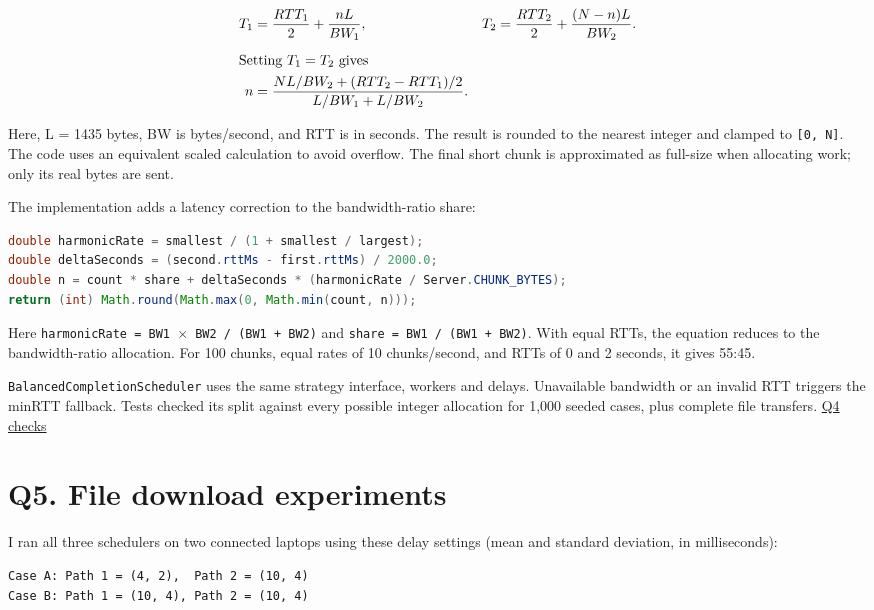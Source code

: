 \documentclass[11pt,a4paper]{article}
\begin{document}
\begin{align*}
T_1 &= \frac{RTT_1}{2}+\frac{nL}{BW_1}, &
T_2 &= \frac{RTT_2}{2}+\frac{(N-n)L}{BW_2}.\\[5pt]
\intertext{Setting $T_1=T_2$ gives}
n &= \frac{NL/BW_2+(RTT_2-RTT_1)/2}{L/BW_1+L/BW_2}.
\end{align*}

Here, L = 1435 bytes, BW is bytes/second, and RTT is in seconds. The result is rounded
to the nearest integer and clamped to \texttt{[0, N]}. The code uses an equivalent scaled
calculation to avoid overflow. The final short chunk is approximated as full-size
when allocating work; only its real bytes are sent.


The implementation adds a latency correction to the bandwidth-ratio share:


\begin{lstlisting}[language=Java]
double harmonicRate = smallest / (1 + smallest / largest);
double deltaSeconds = (second.rttMs - first.rttMs) / 2000.0;
double n = count * share + deltaSeconds * (harmonicRate / Server.CHUNK_BYTES);
return (int) Math.round(Math.max(0, Math.min(count, n)));
\end{lstlisting}

Here \texttt{harmonicRate = BW1 \(\times\) BW2 / (BW1 + BW2)} and \texttt{share = BW1 / (BW1 + BW2)}.
With equal RTTs, the equation reduces to the bandwidth-ratio allocation. For 100
chunks, equal rates of 10 chunks/second, and RTTs of 0 and 2 seconds, it gives 55:45.


\texttt{BalancedCompletionScheduler} uses the same strategy interface, workers and delays.
Unavailable bandwidth or an invalid RTT triggers the minRTT fallback.
Tests checked its split against every possible integer allocation for 1,000 seeded
cases, plus complete file transfers. \href{../results/q4/validation.txt}{Q4 checks}


\section*{Q5. File download experiments}

I ran all three schedulers on two connected laptops using these delay settings
(mean and standard deviation, in milliseconds):


\begin{lstlisting}
Case A: Path 1 = (4, 2),  Path 2 = (10, 4)
Case B: Path 1 = (10, 4), Path 2 = (10, 4)
\end{lstlisting}
\end{document}
